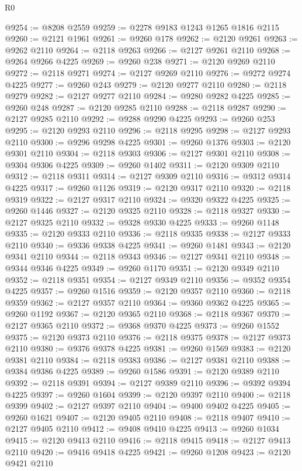 \begin{lexlean}{R0}
\begin{coremodule}
@9254 := @8208 @2559
@9259 := @2278 @9183 @1243 @1265 @1816 @2115
@9260 := @2121 @1961
@9261 := @9260 @178
@9262 := @2120 @9261
@9263 := @9262 @2110
@9264 := @2118 @9263
@9266 := @2127 @9261 @2110
@9268 := @9264 @9266 @4225
@9269 := @9260 @238
@9271 := @2120 @9269 @2110
@9272 := @2118 @9271
@9274 := @2127 @9269 @2110
@9276 := @9272 @9274 @4225
@9277 := @9260 @243
@9279 := @2120 @9277 @2110
@9280 := @2118 @9279
@9282 := @2127 @9277 @2110
@9284 := @9280 @9282 @4225
@9285 := @9260 @248
@9287 := @2120 @9285 @2110
@9288 := @2118 @9287
@9290 := @2127 @9285 @2110
@9292 := @9288 @9290 @4225
@9293 := @9260 @253
@9295 := @2120 @9293 @2110
@9296 := @2118 @9295
@9298 := @2127 @9293 @2110
@9300 := @9296 @9298 @4225
@9301 := @9260 @1376
@9303 := @2120 @9301 @2110
@9304 := @2118 @9303
@9306 := @2127 @9301 @2110
@9308 := @9304 @9306 @4225
@9309 := @9260 @1402
@9311 := @2120 @9309 @2110
@9312 := @2118 @9311
@9314 := @2127 @9309 @2110
@9316 := @9312 @9314 @4225
@9317 := @9260 @1126
@9319 := @2120 @9317 @2110
@9320 := @2118 @9319
@9322 := @2127 @9317 @2110
@9324 := @9320 @9322 @4225
@9325 := @9260 @1446
@9327 := @2120 @9325 @2110
@9328 := @2118 @9327
@9330 := @2127 @9325 @2110
@9332 := @9328 @9330 @4225
@9333 := @9260 @1148
@9335 := @2120 @9333 @2110
@9336 := @2118 @9335
@9338 := @2127 @9333 @2110
@9340 := @9336 @9338 @4225
@9341 := @9260 @1481
@9343 := @2120 @9341 @2110
@9344 := @2118 @9343
@9346 := @2127 @9341 @2110
@9348 := @9344 @9346 @4225
@9349 := @9260 @1170
@9351 := @2120 @9349 @2110
@9352 := @2118 @9351
@9354 := @2127 @9349 @2110
@9356 := @9352 @9354 @4225
@9357 := @9260 @1516
@9359 := @2120 @9357 @2110
@9360 := @2118 @9359
@9362 := @2127 @9357 @2110
@9364 := @9360 @9362 @4225
@9365 := @9260 @1192
@9367 := @2120 @9365 @2110
@9368 := @2118 @9367
@9370 := @2127 @9365 @2110
@9372 := @9368 @9370 @4225
@9373 := @9260 @1552
@9375 := @2120 @9373 @2110
@9376 := @2118 @9375
@9378 := @2127 @9373 @2110
@9380 := @9376 @9378 @4225
@9381 := @9260 @1569
@9383 := @2120 @9381 @2110
@9384 := @2118 @9383
@9386 := @2127 @9381 @2110
@9388 := @9384 @9386 @4225
@9389 := @9260 @1586
@9391 := @2120 @9389 @2110
@9392 := @2118 @9391
@9394 := @2127 @9389 @2110
@9396 := @9392 @9394 @4225
@9397 := @9260 @1604
@9399 := @2120 @9397 @2110
@9400 := @2118 @9399
@9402 := @2127 @9397 @2110
@9404 := @9400 @9402 @4225
@9405 := @9260 @1621
@9407 := @2120 @9405 @2110
@9408 := @2118 @9407
@9410 := @2127 @9405 @2110
@9412 := @9408 @9410 @4225
@9413 := @9260 @1034
@9415 := @2120 @9413 @2110
@9416 := @2118 @9415
@9418 := @2127 @9413 @2110
@9420 := @9416 @9418 @4225
@9421 := @9260 @1208
@9423 := @2120 @9421 @2110

\end{coremodule}
\end{lexlean}
